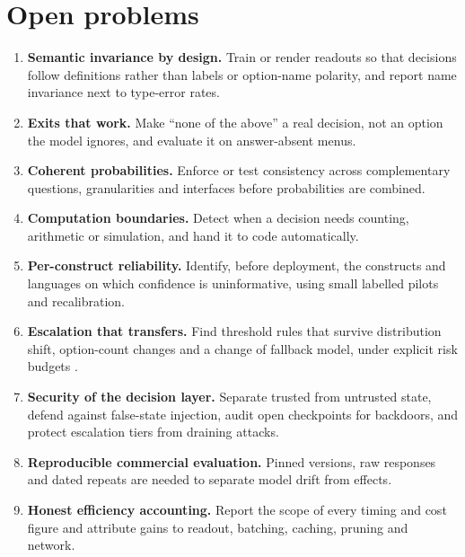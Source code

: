 \section{Open problems}\label{sec:open-problems}

\begin{enumerate}[leftmargin=*,itemsep=2pt]
  \item \textbf{Semantic invariance by design.} Train or render readouts so that decisions follow definitions rather than labels or option-name polarity, and report name invariance next to type-error rates.
  \item \textbf{Exits that work.} Make “none of the above” a real decision, not an option the model ignores, and evaluate it on answer-absent menus.
  \item \textbf{Coherent probabilities.} Enforce or test consistency across complementary questions, granularities and interfaces before probabilities are combined.
  \item \textbf{Computation boundaries.} Detect when a decision needs counting, arithmetic or simulation, and hand it to code automatically.
  \item \textbf{Per-construct reliability.} Identify, before deployment, the constructs and languages on which confidence is uninformative, using small labelled pilots and recalibration.
  \item \textbf{Escalation that transfers.} Find threshold rules that survive distribution shift, option-count changes and a change of fallback model, under explicit risk budgets \citep{arxiv2310_05921,arxiv2107_07511}.
  \item \textbf{Security of the decision layer.} Separate trusted from untrusted state, defend against false-state injection, audit open checkpoints for backdoors, and protect escalation tiers from draining attacks.
  \item \textbf{Reproducible commercial evaluation.} Pinned versions, raw responses and dated repeats are needed to separate model drift from effects.
  \item \textbf{Honest efficiency accounting.} Report the scope of every timing and cost figure and attribute gains to readout, batching, caching, pruning and network.
\end{enumerate}
